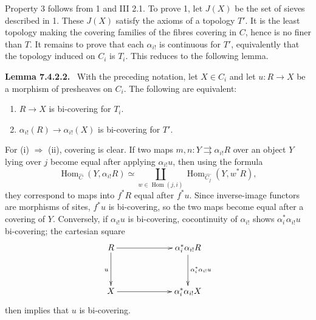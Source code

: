 \documentclass[11pt]{article}
\newcommand{\Hom}{\operatorname{Hom}}
\newenvironment{statement}[1]{\par\medskip\noindent\textbf{#1.}\ }{\par\medskip}
\begin{document}
Property 3 follows from 1 and III 2.1. To prove 1, let \(J(X)\) be the set of sieves described in 1. These \(J(X)\) satisfy the axioms of a topology \(T'\). It is the least topology making the covering families of the fibres covering in \(C\), hence is no finer than \(T\). It remains to prove that each \(\alpha_{i!}\) is continuous for \(T'\), equivalently that the topology induced on \(C_i\) is \(T_i\). This reduces to the following lemma.

\begin{statement}{Lemma 7.4.2.2}
With the preceding notation, let \(X\in C_i\) and let \(u:R\to X\) be a morphism of presheaves on \(C_i\). The following are equivalent:
\begin{enumerate}[label=(\roman*)]
\item \(R\to X\) is bi-covering for \(T_i\).
\item \(\alpha_{i!}(R)\to\alpha_{i!}(X)\) is bi-covering for \(T'\).
\end{enumerate}
\end{statement}

For (i) \(\Rightarrow\) (ii), covering is clear. If two maps \(m,n:Y\rightrightarrows\alpha_{i!}R\) over an object \(Y\) lying over \(j\) become equal after applying \(\alpha_{i!}u\), then using the formula
\[
\Hom_{\widehat C}(Y,\alpha_{i!}R)
\simeq \coprod_{w\in\Hom(j,i)}\Hom_{\widehat{C_j}}(Y,w^*R),
\]
they correspond to maps into \(f^*R\) equal after \(f^*u\). Since inverse-image functors are morphisms of sites, \(f^*u\) is bi-covering, so the two maps become equal after a covering of \(Y\). Conversely, if \(\alpha_{i!}u\) is bi-covering, cocontinuity of \(\alpha_{i!}\) shows \(\alpha_i^*\alpha_{i!}u\) bi-covering; the cartesian square
\[
\xymatrix@C=2.25cm@R=1.25cm{
R\ar[r]\ar[d]_u&\alpha_i^*\alpha_{i!}R\ar[d]^{\alpha_i^*\alpha_{i!}u}\\
X\ar[r]&\alpha_i^*\alpha_{i!}X
}
\]
then implies that \(u\) is bi-covering.
\end{document}
